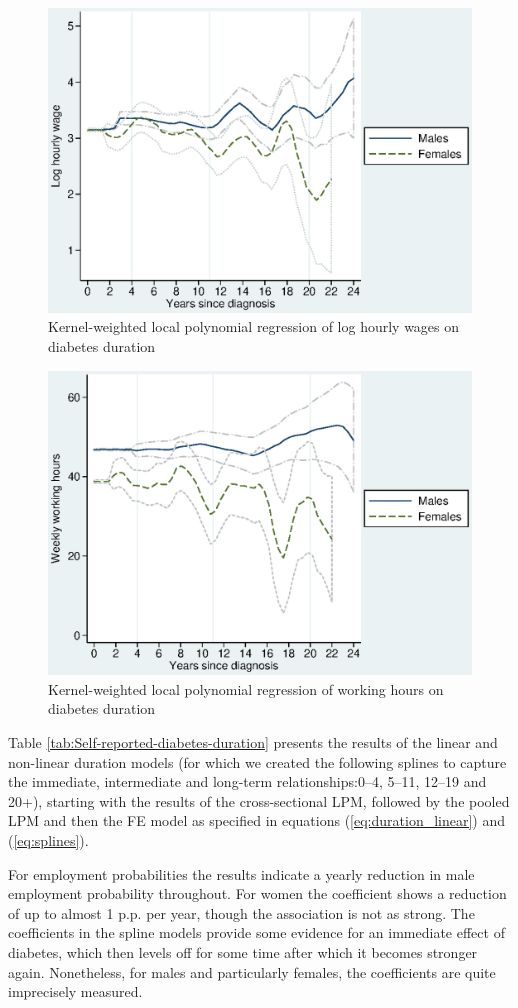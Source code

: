 \documentclass[12pt,english]{article}
\begin{document}
\begin{figure}[h!]
\caption{\label{fig:Kernel-weighted-local-polynomial_wage}Kernel-weighted local
polynomial regression of log hourly wages on diabetes duration}%
\begin{center}
\includegraphics[width=0.5\columnwidth]{figures/lpoly_wage_diabetesduration.eps}
\end{center}
\end{figure}

\begin{figure}[h!]
\caption{\label{fig:Kernel-weighted-local-polynomial_workhrs}Kernel-weighted local
polynomial regression of working hours on diabetes duration}%
\begin{center}
\includegraphics[width=0.5\columnwidth]{figures/lpoly_workhrs_diabetesduration.eps}
\end{center}
\end{figure}

\FloatBarrier

Table \ref{tab:Self-reported-diabetes-duration} presents the results of the linear and non-linear duration models (for which we created the following splines to capture the immediate, intermediate and long-term relationships:0--4,
5--11, 12--19 and 20+), starting with the results of the cross-sectional \ac{LPM}, followed by the pooled \ac{LPM} and then the \ac{FE} model as specified in equations (\ref{eq:duration_linear}) and (\ref{eq:splines}).

For employment probabilities the results indicate a yearly reduction in male employment probability throughout. For women the coefficient shows a reduction of up to almost 1 \ac{p.p.} per year, though the association is not as strong. The coefficients in the spline models provide some evidence for an immediate effect of diabetes, which then levels off for some time after which it becomes stronger again. Nonetheless, for males and particularly females, the coefficients are quite imprecisely measured.
\end{document}
